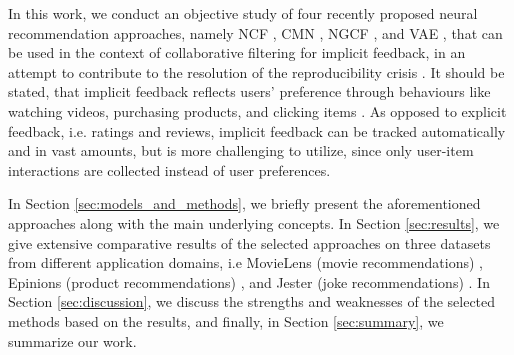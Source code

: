 In this work, we conduct an objective study of four recently proposed neural recommendation approaches, namely NCF \cite{he2017neural}, CMN \cite{ebesu2018collaborative}, NGCF \cite{wang2019neural}, and VAE \cite{liang2018variational}, that can be used in the context of collaborative filtering for implicit feedback, in an attempt to contribute to the resolution of the reproducibility crisis \cite{dacrema2019we}.
It should be stated, that implicit feedback reflects users' preference through behaviours like watching videos, purchasing products, and clicking items \cite{hu2008collaborative}.
As opposed to explicit feedback, i.e. ratings and reviews, implicit feedback can be tracked automatically and in vast amounts, but is more challenging to utilize, since only user-item interactions are collected instead of user preferences.

In Section \ref{sec:models_and_methods}, we briefly present the aforementioned approaches along with the main underlying concepts.
In Section \ref{sec:results}, we give extensive comparative results of the selected approaches on three datasets from different application domains, i.e MovieLens (movie recommendations) \cite{harper2016movielens}, Epinions (product recommendations) \cite{epinions}, and Jester (joke recommendations) \cite{jester}.
In Section \ref{sec:discussion}, we discuss the strengths and weaknesses of the selected methods based on the results, and finally, in Section \ref{sec:summary}, we summarize our work.


